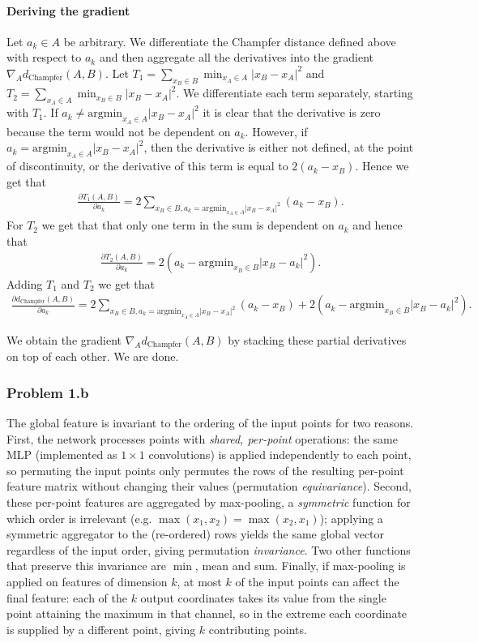 \documentclass{article}
\begin{document}
\paragraph{Deriving the gradient}
Let $a_k\in A$ be arbitrary. We differentiate the Champfer distance defined above with respect to $a_k$ and then aggregate all the derivatives into the gradient $\nabla_Ad_{\text{Champfer}}(A,B)$. Let $T_1=\sum_{x_B\in B}\min_{x_A\in A}{\lvert x_B-x_A\rvert^2}$ and $T_2=\sum_{x_A\in A}\min_{x_B\in B}{\lvert x_B-x_A\rvert^2}$. We differentiate each term separately, starting with $T_1$. If $a_k\neq \text{argmin}_{x_A\in A}{\lvert x_B-x_A\rvert^2}$ it is clear that the derivative is zero because the term would not be dependent on $a_k$. However, if $a_k= \text{argmin}_{x_A\in A}{\lvert x_B-x_A\rvert^2}$, then the derivative is either not defined, at the point of discontinuity, or the derivative of this term is equal to $2(a_k-x_B)$. Hence we get that 
\begin{align*}
    \frac{\partial T_1(A,B)}{\partial a_k}=2\sum_{x_B\in B,a_k=\text{argmin}_{x_A\in A}{\lvert x_B-x_A\rvert^2}}(a_k-x_B).
\end{align*}
For $T_2$ we get that that only one term in the sum is dependent on $a_k$ and hence that 
\begin{align*}
    \frac{\partial T_2(A,B)}{\partial a_k}=2(a_k-\text{argmin}_{x_B\in B}{\lvert x_B-a_k\rvert^2}).
\end{align*}
Adding $T_1$ and $T_2$ we get that 
\begin{align*}
    \frac{\partial d_{\text{Champfer}}(A,B)}{\partial a_k}=2\sum_{x_B\in B,a_k=\text{argmin}_{x_A\in A}{\lvert x_B-x_A\rvert^2}}(a_k-x_B)+2(a_k-\text{argmin}_{x_B\in B}{\lvert x_B-a_k\rvert^2}). 
\end{align*}

We obtain the gradient $\nabla_Ad_{\text{Champfer}}(A,B)$ by stacking these partial derivatives on top of each other. We are done. 
\newpage
\subsubsection*{Problem 1.b}
The global feature is invariant to the ordering of the input points for two reasons. First, the network processes points with \emph{shared, per-point} operations: the same MLP (implemented as $1\times1$ convolutions) is applied independently to each point, so permuting the input points only permutes the rows of the resulting per-point feature matrix without changing their values (permutation \emph{equivariance}). Second, these per-point features are aggregated by max-pooling, a \emph{symmetric} function for which order is irrelevant (e.g. $\max(x_1, x_2) = \max(x_2, x_1)$); applying a symmetric aggregator to the (re-ordered) rows yields the same global vector regardless of the input order, giving permutation \emph{invariance}. Two other functions that preserve this invariance are $\min$, mean and sum. Finally, if max-pooling is applied on features of dimension $k$, at most $k$ of the input points can affect the final feature: each of the $k$ output coordinates takes its value from the single point attaining the maximum in that channel, so in the extreme each coordinate is supplied by a different point, giving $k$ contributing points.
\end{document}
